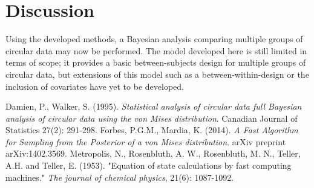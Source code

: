 \documentclass[11pt,a4paper]{article}
\begin{document}
\section{Discussion}

Using the developed methods, a Bayesian analysis comparing multiple groups of circular data may now be performed. The model developed here is still limited in terms of scope; it provides a basic between-subjects design for multiple groups of circular data, but extensions of this model such as a between-within-design or the inclusion of covariates have yet to be developed. 






\begin{thebibliography}{99}
 Damien, P., Walker, S. (1995). \textit{Statistical analysis of circular data full {Bayes}ian analysis of circular data using the von Mises distribution}. Canadian Journal of Statistics 27(2): 291-298.
 Forbes, P.G.M., Mardia, K. (2014). \textit{A Fast Algorithm for Sampling from the Posterior of a von Mises distribution}. arXiv preprint arXiv:1402.3569.
  Metropolis, N., Rosenbluth, A. W., Rosenbluth, M. N., Teller, A.H. and Teller, E. (1953). "Equation of state calculations by fast computing machines." \textit{The journal of chemical physics}, 21(6): 1087-1092.
\end{thebibliography}
\end{document}
